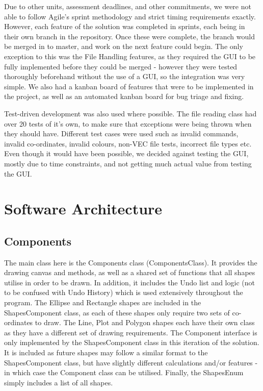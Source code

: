 \documentclass[12pt]{article} %
\begin{document}
Due to other units, assessment deadlines, and other commitments, we were not able to follow Agile's sprint methodology and strict timing requirements exactly. However, each feature of the solution was completed in sprints, each being in their own branch in the repository. Once these were complete, the branch would be merged in to master, and work on the next feature could begin. The only exception to this was the File Handling features, as they required the GUI to be fully implemented before they could be merged - however they were tested thoroughly beforehand without the use of a GUI, so the integration was very simple. We also had a kanban board of features that were to be implemented in the project, as well as an automated kanban board for bug triage and fixing.

Test-driven development was also used where possible. The file reading class had over 20 tests of it's own, to make sure that exceptions were being thrown when they should have. Different test cases were used such as invalid commands, invalid co-ordinates, invalid colours, non-VEC file tests, incorrect file types etc. Even though it would have been possible, we decided against testing the GUI, mostly due to time constraints, and not getting much actual value from testing the GUI.


\newpage

\section{Software Architecture}

\subsection{Components}
The main class here is the Components class (ComponentsClass). It provides the drawing canvas and methods, as well as a shared set of functions that all shapes utilise in order to be drawn. In addition, it includes the Undo list and logic (not to be confused with Undo History) which is used extensively throughout the program. The Ellipse and Rectangle shapes are included in the ShapesComponent class, as each of these shapes only require two sets of co-ordinates to draw. The Line, Plot and Polygon shapes each have their own class as they have a different set of drawing requirements. The Component interface is only implemented by the ShapesComponent class in this iteration of the solution. It is included as future shapes may follow a similar format to the ShapesComponent class, but have slightly different calculations and/or features - in which case the Component class can be utilised. Finally, the ShapesEnum simply includes a list of all shapes.
\end{document}
